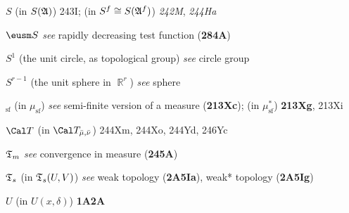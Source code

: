 \indexmedskip
{}

$S$ (in $S(\frak A)$) 243I; 
  (in $S^f\cong S(\frak A^f)$) {\it 242M}, {\it 244Ha}




$\eusm S$ {\it see} rapidly decreasing test function ({\bf 284A})




$S^1$ (the unit circle, as topological group) {\it see} circle group


$S^{r-1}$ (the unit sphere in $\BbbR^r$) {\it see} sphere









$_{\text{sf}}$ (in $\mu_{\text{sf}}$)
{\it see} semi-finite version of a measure ({\bf 213Xc});
  (in $\mu^*_{\text{sf}}$) {\bf 213Xg}, 213Xi


















\indexmedskip
{}









$\Cal T$ (in $\Cal T_{\bar\mu,\bar\nu}$) 244Xm, 244Xo, 244Yd,
246Yc












$\frak T_m$ {\it see} convergence in measure ({\bf 245A})






$\frak T_s$ (in $\frak T_s(U,V)$)  
  {\it see} weak topology ({\bf 2A5Ia}),
  weak* topology ({\bf 2A5Ig})




\indexmedskip
{}

$U$ (in $U(x,\delta)$) {\bf 1A2A}












